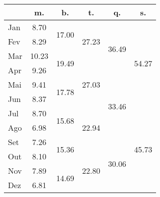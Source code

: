\begin{center}
\begin{tabular}{| l || c | c | c | c | c |}\hline
 & m. & b. & t. & q. & s. \\\hline
Jan & \multirow{1}{*}{ 8.70 }  & \multirow{2}{*}{ 17.00 }  & \multirow{3}{*}{ 27.23 }  & \multirow{4}{*}{ 36.49 }  & \multirow{6}{*}{ 54.27 }  \\\cline{2-2}
Fev & \multirow{1}{*}{ 8.29 }  & & & & \\\cline{2-2}\cline{3-3}
Mar & \multirow{1}{*}{ 10.23 }  & \multirow{2}{*}{ 19.49 }  & & & \\\cline{2-2}\cline{4-4}
Apr & \multirow{1}{*}{ 9.26 }  & & \multirow{3}{*}{ 27.03 }  & & \\\cline{2-2}\cline{3-3}\cline{5-5}
Mai & \multirow{1}{*}{ 9.41 }  & \multirow{2}{*}{ 17.78 }  & & \multirow{4}{*}{ 33.46 }  & \\\cline{2-2}
Jun & \multirow{1}{*}{ 8.37 }  & & & & \\\cline{2-2}\cline{3-3}\cline{4-4}\cline{6-6}
Jul & \multirow{1}{*}{ 8.70 }  & \multirow{2}{*}{ 15.68 }  & \multirow{3}{*}{ 22.94 }  & & \multirow{6}{*}{ 45.73 }  \\\cline{2-2}
Ago & \multirow{1}{*}{ 6.98 }  & & & & \\\cline{2-2}\cline{3-3}\cline{5-5}
Set & \multirow{1}{*}{ 7.26 }  & \multirow{2}{*}{ 15.36 }  & & \multirow{4}{*}{ 30.06 }  & \\\cline{2-2}\cline{4-4}
Out & \multirow{1}{*}{ 8.10 }  & & \multirow{3}{*}{ 22.80 }  & & \\\cline{2-2}\cline{3-3}
Nov & \multirow{1}{*}{ 7.89 }  & \multirow{2}{*}{ 14.69 }  & & & \\\cline{2-2}
Dez & \multirow{1}{*}{ 6.81 }  & & & & \\\cline{2-2}\cline{3-3}\cline{4-4}\cline{5-5}\cline{6-6}
\hline\end{tabular}
\end{center}